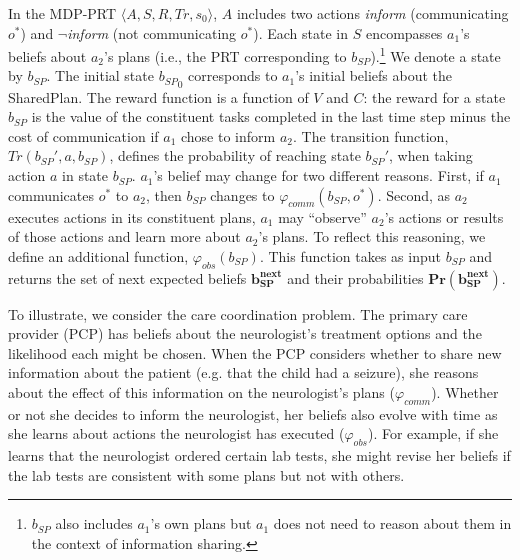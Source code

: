  In the MDP-PRT $\langle A, S, R, Tr, s_0 \rangle$, $A$ includes two actions {\em inform} (communicating $o^*$) and $\neg${\em inform} (not communicating $o^*$). Each state in $S$ encompasses $a_1$'s beliefs about $a_2$'s plans (i.e., the PRT corresponding to $b_{SP}$).\footnote{$b_{SP}$ also includes $a_1$'s own plans but $a_1$ does not need to reason about them in the context of information sharing.} 
 We denote a state by $b_{SP}$.
 The initial state ${b_{SP}}_{0}$ corresponds to $a_1$'s initial beliefs about the SharedPlan.
The reward function is a function of $V$ and $C$: the reward for a state $b_{SP}$ is the  value of the constituent tasks completed in the last time step minus the cost of communication if $a_1$ chose to inform $a_2$. 
The transition function, $Tr({b_{SP}}',a,b_{SP})$, defines the probability of reaching state ${b_{SP}}'$, when taking action $a$ in state $b_{SP}$. $a_1$'s belief may change for two different reasons. First, if $a_1$ communicates $o^*$ to $a_2$, then $b_{SP}$ changes to $\varphi_{comm}(b_{SP},o^*)$. 
Second, as $a_2$ executes actions in its constituent plans, $a_1$ may ``observe'' $a_2$'s actions or results of those actions and learn more about $a_2$'s plans. To reflect this reasoning, we define an additional function, $\varphi_{obs}(b_{SP})$. This function takes as input $b_{SP}$ and returns the set of next expected beliefs $\mathbf{b_{SP}^{next}}$ and their probabilities $\mathbf{Pr(b_{SP}^{next})}$. 


 To illustrate, we consider the care coordination problem. The primary care provider (PCP) has beliefs about the neurologist's treatment options and the likelihood each might be chosen. When the PCP considers whether to share new information about the patient (e.g. that the child had a seizure), she reasons about the effect of this information on the neurologist's plans ($\varphi_{comm}$). Whether or not she decides to inform the neurologist, her beliefs also evolve with time as she learns about actions the neurologist has executed ($\varphi_{obs}$). For example, if she learns that the neurologist ordered certain lab tests, she might revise her beliefs if the lab tests are consistent with some plans but not with others.


